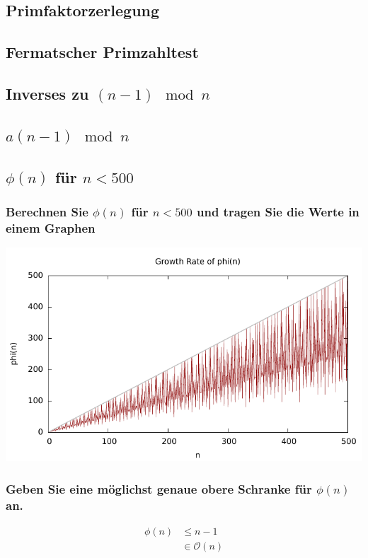 \subsection{Primfaktorzerlegung}
\subsection{Fermatscher Primzahltest}

\subsection{Inverses zu $(n-1) \mod n$}
\subsection{$a(n-1) \mod n$}
\subsection{$\phi(n)$ für $n < 500$}
\subsubsection{Berechnen Sie $\phi(n)$ für $n < 500$ und tragen Sie die Werte in einem Graphen}

\includegraphics[scale=1]{eclipse/growth-rate.pdf}

\subsubsection{Geben Sie eine möglichst genaue obere Schranke für $\phi(n)$ an.}

\begin{align}
	 \phi(n) &\le n-1 \\
	         & \in \mathcal{O}(n)
\end{align}	
